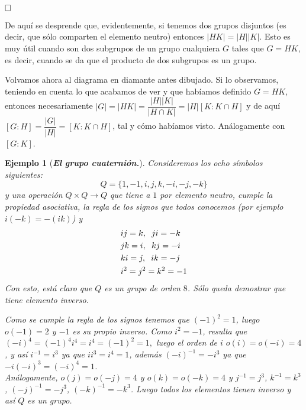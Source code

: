 \documentclass[12pt]{article}
\newtheorem{example}{Ejemplo}[theorem]
\begin{document}
$\hfill \square$

De aquí se desprende que, evidentemente, si tenemos dos grupos disjuntos (es decir, que sólo comparten el elemento neutro) entonces $|HK| = |H||K|$. Esto es muy útil cuando son dos subgrupos de un grupo cualquiera $G$ tales que $G = HK$, es decir, cuando se da que el producto de dos subgrupos es un grupo.

Volvamos ahora al diagrama en diamante antes dibujado. Si lo observamos, teniendo en cuenta lo que acabamos de ver y que habíamos definido $G= HK$, entonces necesariamente $|G| =|HK| = \dfrac{|H| |K|}{|H \cap K |} = |H| [K : K \cap H]$ y de aquí $[G:H] = \dfrac{|G|}{|H|} = [K : K \cap H]$, tal y cómo habíamos visto. Análogamente con $[G:K]$.

\begin{example}[\textbf{\textit{El grupo cuaternión.}}]
Consideremos los ocho símbolos siguientes: $$ Q = \lbrace 1,-1, i, j, k, -i,-j,-k \rbrace$$ y una operación $Q \times Q \longrightarrow Q$ que tiene a $1$ por elemento neutro, cumple la propiedad asociativa, la regla de los signos que todos conocemos (por ejemplo $i(-k) = -(ik)$) y \begin{equation*}
\begin{aligned}
&ij = k, \hspace{0.2cm} ji = -k\\
&jk = i, \hspace{0.2cm} kj = -i\\
&ki = j, \hspace{0.2cm} ik = -j\\
&i^{2} = j^{2} = k^{2} = -1
\end{aligned}
\end{equation*}
Con esto, está claro que $Q$ es un grupo de orden $8$. Sólo queda demostrar que tiene elemento inverso. 


Como se cumple la regla de los signos tenemos que $(-1)^{2} = 1$, luego $o(-1) =2$ y $-1$ es su propio inverso. Como $i^{2} = -1$, resulta que $(-i)^{4} = (-1)^{4}i^{4} = i^{4} = (-1)^{2} = 1,$ luego el orden de $i$ $o(i) = o(-i) = 4$, y así $i^{-1} = i^{3}$ ya que $ii^{3} = i^{4} = 1$, además $(-i)^{-1} = -i^{3}$ ya que $-i(-i)^{3} = (-i)^{4} = 1$. \vspace{0.2cm}\\
Análogamente, $o(j) = o(-j) = 4$ y $o(k) = o(-k) = 4$ y $j^{-1} = j^{3}$, $k^{-1} = k^{3}$, $(-j)^{-1} = -j^{3}$, $(-k)^{-1} = -k^{3}$. Luego todos los elementos tienen inverso y así $Q$ es un grupo.



\end{example}
\end{document}
